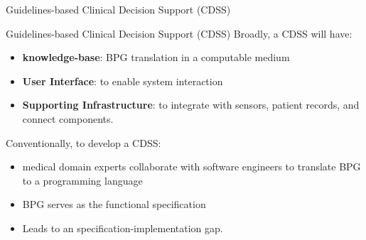 \documentclass{beamer}
\begin{document}

\begin{frame}{Guidelines-based Clinical Decision Support (CDSS)}
  
\end{frame}

\begin{frame}{Guidelines-based Clinical Decision Support (CDSS)}
  Broadly, a CDSS will have:
  \begin{itemize}
    \item \textbf{knowledge-base}: BPG translation in a computable medium
    \item \textbf{User Interface}: to enable system interaction
    \item \textbf{Supporting Infrastructure}: to integrate with sensors, patient
      records, and connect components.
  \end{itemize}
  \pause
  Conventionally, to develop a CDSS:
  \begin{itemize}
    \item medical domain experts collaborate with software engineers to
      translate BPG to a programming language
    \item BPG serves as the functional specification
    \item Leads to an \alert{specification-implementation gap}.
  \end{itemize}
\end{frame}
\end{document}
